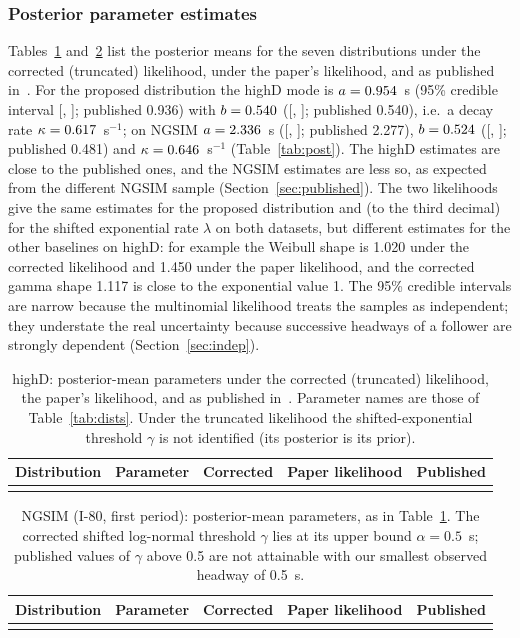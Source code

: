 \documentclass[11pt,a4paper]{article}
\numberwithin{equation}{section}
\begin{document}
\subsubsection{Posterior parameter estimates}
Tables~\ref{tab:params_hd} and~\ref{tab:params_ng} list the posterior means for the seven distributions under the corrected (truncated) likelihood, under the paper's likelihood, and as published in~\cite{leungbootnak}.
For the proposed distribution the highD mode is $a=0.954$~s (95\% credible interval [\hdALo, \hdAHi]; published 0.936) with $b=0.540$ ([\hdBLo, \hdBHi]; published 0.540), i.e.\ a decay rate $\kappa=0.617$~s$^{-1}$; on NGSIM $a=2.336$~s ([\ngALo, \ngAHi]; published 2.277), $b=0.524$ ([\ngBLo, \ngBHi]; published 0.481) and $\kappa=0.646$~s$^{-1}$
(Table~\ref{tab:post}). The highD estimates are close to the published ones, and the NGSIM estimates are less so, as expected from the different NGSIM sample (Section~\ref{sec:published}). The two likelihoods give the same estimates for the proposed distribution and (to the third decimal) for the shifted exponential rate $\lambda$ on both datasets, but
different estimates for the other baselines on highD: for example the Weibull shape is 1.020 under the corrected likelihood and 1.450 under the paper likelihood, and the corrected gamma shape 1.117 is close to the exponential value 1. The 95\% credible intervals are narrow because the multinomial likelihood treats the samples as independent; they understate the real uncertainty
because successive headways of a follower are strongly dependent (Section~\ref{sec:indep}).

\begin{table}[H]
\centering\footnotesize
\caption{highD: posterior-mean parameters under the corrected (truncated) likelihood, the paper's likelihood, and as published in~\cite{leungbootnak}. Parameter names are those of Table~\ref{tab:dists}. Under the truncated likelihood the shifted-exponential threshold $\gamma$ is not identified (its posterior is its prior).}
\label{tab:params_hd}
\begin{tabular}{@{}llrrr@{}}
\toprule
Distribution & Parameter & Corrected & Paper likelihood & Published \\
\midrule
\\
\bottomrule
\end{tabular}
\end{table}

\begin{table}[H]
\centering\footnotesize
\caption{NGSIM (I-80, first period): posterior-mean parameters, as in Table~\ref{tab:params_hd}. The corrected shifted log-normal threshold $\gamma$ lies at its upper bound $\alpha=0.5$~s; published values of $\gamma$ above 0.5 are not attainable with our smallest observed headway of 0.5~s.}
\label{tab:params_ng}
\begin{tabular}{@{}llrrr@{}}
\toprule
Distribution & Parameter & Corrected & Paper likelihood & Published \\
\midrule
\\
\bottomrule
\end{tabular}
\end{table}
\end{document}
